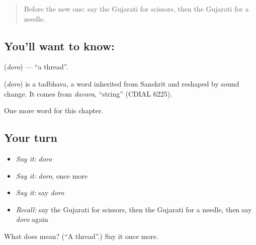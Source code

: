 \label{lesson:GU-C108-doro}



\begin{quote}
Before the new one: say the Gujarati for scissors, then the Gujarati for a needle.
\end{quote}

\subsection*{You'll want to know: }
\textbf{} (\emph{doro}) — \textquotedblleft{}a thread\textquotedblright{}.

\begin{cousinweb}
\textbf{} (\emph{doro}) is a tadbhava, a word inherited from Sanskrit and reshaped by sound change. It comes from \emph{davara}, \textquotedblleft{}string\textquotedblright{} (CDIAL 6225).
\end{cousinweb}

\begin{grammarlens}[title={What you've built}]
One more word for this chapter.
\end{grammarlens}

\subsection*{Your turn}
\begin{itemize}
\raggedright
  \item \emph{Say it:} \emph{doro}
  \item \emph{Say it:} \emph{doro}, once more
  \item \emph{Say it:} say \emph{doro}
  \item \emph{Recall:} say the Gujarati for scissors, then the Gujarati for a needle, then say \emph{doro} again
\end{itemize}

\begin{tcolorbox}[breakable,colback=teal!4,colframe=teal!35!black,title={Before you move on}]
What does  mean? (\textquotedblleft{}A thread\textquotedblright{}.) Say it once more.
\end{tcolorbox}
